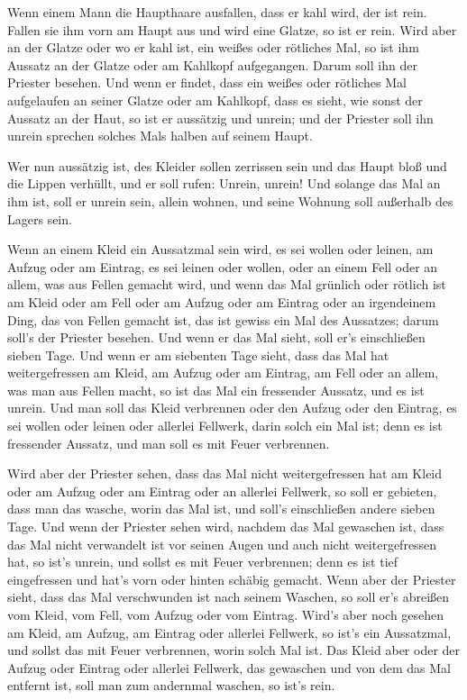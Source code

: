  Wenn einem Mann die Haupthaare ausfallen, dass er kahl
wird, der ist rein.  Fallen sie ihm vorn am Haupt aus und
wird eine Glatze, so ist er rein.  Wird aber an der
Glatze oder wo er kahl ist, ein weißes oder rötliches Mal, so ist ihm
Aussatz an der Glatze oder am Kahlkopf aufgegangen. 
Darum soll ihn der Priester besehen. Und wenn er findet, dass ein weißes
oder rötliches Mal aufgelaufen an seiner Glatze oder am Kahlkopf, dass
es sieht, wie sonst der Aussatz an der Haut,  so ist er
aussätzig und unrein; und der Priester soll ihn unrein sprechen solches
Mals halben auf seinem Haupt.

 Wer nun aussätzig ist, des Kleider sollen zerrissen sein
und das Haupt bloß und die Lippen verhüllt, und er soll rufen: Unrein,
unrein!  Und solange das Mal an ihm ist, soll er unrein
sein, allein wohnen, und seine Wohnung soll außerhalb des Lagers sein.

 Wenn an einem Kleid ein Aussatzmal sein wird, es sei
wollen oder leinen,  am Aufzug oder am Eintrag, es sei
leinen oder wollen, oder an einem Fell oder an allem, was aus Fellen
gemacht wird,  und wenn das Mal grünlich oder rötlich ist
am Kleid oder am Fell oder am Aufzug oder am Eintrag oder an irgendeinem
Ding, das von Fellen gemacht ist, das ist gewiss ein Mal des Aussatzes;
darum soll's der Priester besehen.  Und wenn er das Mal
sieht, soll er's einschließen sieben Tage.  Und wenn er
am siebenten Tage sieht, dass das Mal hat weitergefressen am Kleid, am
Aufzug oder am Eintrag, am Fell oder an allem, was man aus Fellen macht,
so ist das Mal ein fressender Aussatz, und es ist unrein.
 Und man soll das Kleid verbrennen oder den Aufzug oder
den Eintrag, es sei wollen oder leinen oder allerlei Fellwerk, darin
solch ein Mal ist; denn es ist fressender Aussatz, und man soll es mit
Feuer verbrennen.

 Wird aber der Priester sehen, dass das Mal nicht
weitergefressen hat am Kleid oder am Aufzug oder am Eintrag oder an
allerlei Fellwerk,  so soll er gebieten, dass man das
wasche, worin das Mal ist, und soll's einschließen andere sieben Tage.
 Und wenn der Priester sehen wird, nachdem das Mal
gewaschen ist, dass das Mal nicht verwandelt ist vor seinen Augen und
auch nicht weitergefressen hat, so ist's unrein, und sollst es mit Feuer
verbrennen; denn es ist tief eingefressen und hat's vorn oder hinten
schäbig gemacht.  Wenn aber der Priester sieht, dass das
Mal verschwunden ist nach seinem Waschen, so soll er's abreißen vom
Kleid, vom Fell, vom Aufzug oder vom Eintrag.  Wird's
aber noch gesehen am Kleid, am Aufzug, am Eintrag oder allerlei
Fellwerk, so ist's ein Aussatzmal, und sollst das mit Feuer verbrennen,
worin solch Mal ist.  Das Kleid aber oder der Aufzug oder
Eintrag oder allerlei Fellwerk, das gewaschen und von dem das Mal
entfernt ist, soll man zum andernmal waschen, so ist's rein.

